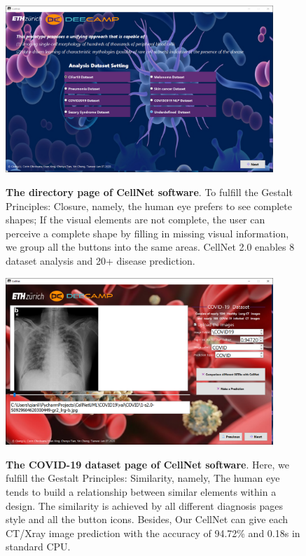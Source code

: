 \begin{figure}[t]
\begin{center}
\includegraphics[height=0.3\textheight,width=0.9\textwidth]{thesis-template-master/images/cellnet2page.PNG}
\label{fig:cellnet}
\end{center}
\caption{ \textbf{The directory page of CellNet software}. To fulfill the Gestalt Principles: Closure, namely, the human eye prefers to see complete shapes; If the visual elements are not complete, the user can perceive a complete shape by filling in missing visual information, we group all the buttons into the same areas. CellNet 2.0 enables 8 dataset analysis and 20+ disease prediction.}
\label{fig:6.11}
\end{figure}


\begin{figure}[t]
\begin{center}
\includegraphics[height=0.3\textheight,width=0.9\textwidth]{thesis-template-master/images/cellnet4-3page.PNG}
\label{fig:cellnet}
\end{center}
\caption{ \textbf{The COVID-19 dataset page of CellNet software}. Here, we fulfill the Gestalt Principles: Similarity, namely, The human eye tends to build a relationship between similar elements within a design. The similarity is achieved by all different diagnosis pages style and all the button icons. Besides, Our CellNet can give each CT/Xray image prediction with the accuracy of 94.72\% and 0.18s in standard CPU.}
\label{fig:6.12}
\end{figure}


